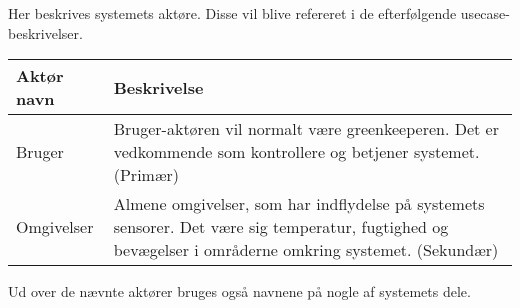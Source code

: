 Her beskrives systemets aktøre. Disse vil blive refereret i de efterfølgende usecase-beskrivelser.

%

\begin{table}[!htbp] \centering
	\begin{tabular}{|p{2.5cm}|p{11.5cm}|}
	\hline
		\textbf{Aktør navn} & \textbf{Beskrivelse} \\\hline
		Bruger & Bruger-aktøren vil normalt være greenkeeperen. Det er vedkommende som kontrollere og betjener systemet. (Primær) \\\hline

		Omgivelser & Almene omgivelser, som har indflydelse på systemets sensorer. Det være sig temperatur, fugtighed og bevægelser i områderne omkring systemet. (Sekundær) \\\hline
	\end{tabular}
\end{table}

Ud over de nævnte aktører bruges også navnene på nogle af systemets dele.
